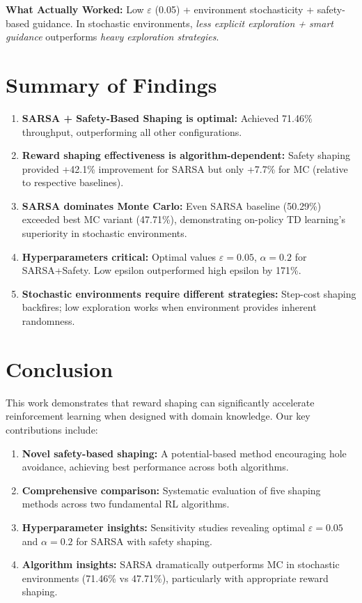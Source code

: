 \documentclass[11pt,a4paper]{article}
\begin{document}
\textbf{What Actually Worked:} Low $\varepsilon$ (0.05) + environment stochasticity + safety-based guidance. In stochastic environments, \emph{less explicit exploration + smart guidance} outperforms \emph{heavy exploration strategies}.

\section{Summary of Findings}

\begin{enumerate}
    \item \textbf{SARSA + Safety-Based Shaping is optimal:} Achieved 71.46\% throughput, outperforming all other configurations.
    
    \item \textbf{Reward shaping effectiveness is algorithm-dependent:} Safety shaping provided +42.1\% improvement for SARSA but only +7.7\% for MC (relative to respective baselines).
    
    \item \textbf{SARSA dominates Monte Carlo:} Even SARSA baseline (50.29\%) exceeded best MC variant (47.71\%), demonstrating on-policy TD learning's superiority in stochastic environments.
    
    \item \textbf{Hyperparameters critical:} Optimal values $\varepsilon=0.05$, $\alpha=0.2$ for SARSA+Safety. Low epsilon outperformed high epsilon by 171\%.
    
    \item \textbf{Stochastic environments require different strategies:} Step-cost shaping backfires; low exploration works when environment provides inherent randomness.
\end{enumerate}

\section{Conclusion}

This work demonstrates that reward shaping can significantly accelerate reinforcement learning when designed with domain knowledge. Our key contributions include:

\begin{enumerate}
    \item \textbf{Novel safety-based shaping:} A potential-based method encouraging hole avoidance, achieving best performance across both algorithms.
    
    \item \textbf{Comprehensive comparison:} Systematic evaluation of five shaping methods across two fundamental RL algorithms.
    
    \item \textbf{Hyperparameter insights:} Sensitivity studies revealing optimal $\varepsilon=0.05$ and $\alpha=0.2$ for SARSA with safety shaping.
    
    \item \textbf{Algorithm insights:} SARSA dramatically outperforms MC in stochastic environments (71.46\% vs 47.71\%), particularly with appropriate reward shaping.
\end{enumerate}
\end{document}
